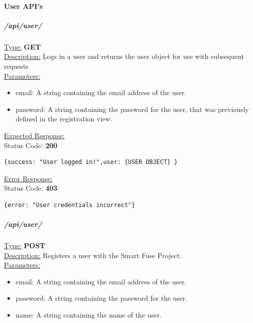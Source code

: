 \documentclass[draft,preprint,12pt,3p]{elsarticle}
\newcommand{\forceindent}{\leavevmode{\parindent=1em\indent}}
\begin{document}
\paragraph{User API's}

\subparagraph*{/api/user/}
\underline{Type:} \textbf{GET}\\

\underline{Description:} Logs in a user and returns the user object for use with subsequent requests\\

\underline{Parameters:}
\begin{itemize}
\item email: A string containing the email address of the user.

\item password: A string containing the password for the user, that was previously defined in the registration view.

\end{itemize}

\underline{Expected Response:}\\[5pt]
\forceindent Status Code: \textbf{200} \\
\begin{verbatim}
{success: "User logged in!",user: {USER OBJECT} }
\end{verbatim}
\underline{Error Response:}\\[5pt]
\forceindent Status Code: \textbf{403} \\
\begin{verbatim}
{error: "User credentials incorrect"}
\end{verbatim}


\subparagraph*{/api/user/}


\underline{Type:} \textbf{POST}\\

\underline{Description:} Registers a user with the Smart Fuse Project.\\

\underline{Parameters:}
\begin{itemize}
\item email: A string containing the email address of the user.

\item password: A string containing the password for the user.

\item name: A string containing the name of the user.

\end{itemize}
\end{document}
